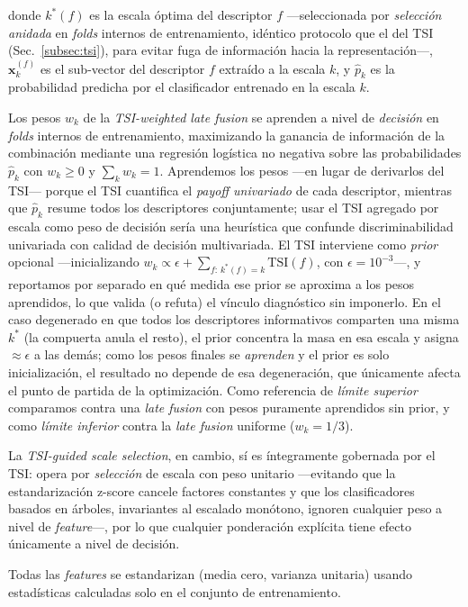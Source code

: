 \documentclass[conference]{IEEEtran}
\begin{document}
donde $k^*(f)$ es la escala óptima del descriptor $f$ ---seleccionada por \emph{selección anidada} en \textit{folds} internos de entrenamiento, idéntico protocolo que el del TSI (Sec.~\ref{subsec:tsi}), para evitar fuga de información hacia la representación---, $\mathbf{x}^{(f)}_{k}$ es el sub-vector del descriptor $f$ extraído a la escala $k$, y $\hat{p}_k$ es la probabilidad predicha por el clasificador entrenado en la escala $k$.


Los pesos $w_k$ de la \textit{TSI-weighted late fusion} se aprenden a nivel de \emph{decisión} en \textit{folds} internos de entrenamiento, maximizando la ganancia de información de la combinación mediante una regresión logística no negativa sobre las probabilidades $\hat{p}_k$ con $w_k\geq 0$ y $\sum_k w_k = 1$. Aprendemos los pesos ---en lugar de derivarlos del TSI--- porque el TSI cuantifica el \emph{payoff univariado} de cada descriptor, mientras que $\hat{p}_k$ resume todos los descriptores conjuntamente; usar el TSI agregado por escala como peso de decisión sería una heurística que confunde discriminabilidad univariada con calidad de decisión multivariada. El TSI interviene como \emph{prior} opcional ---inicializando $w_k \propto \epsilon + \sum_{f:\,k^*(f)=k}\mathrm{TSI}(f)$, con $\epsilon=10^{-3}$---, y reportamos por separado en qué medida ese prior se aproxima a los pesos aprendidos, lo que valida (o refuta) el vínculo diagnóstico sin imponerlo. En el caso degenerado en que todos los descriptores informativos comparten una misma $k^*$ (la compuerta anula el resto), el prior concentra la masa en esa escala y asigna $\approx\epsilon$ a las demás; como los pesos finales se \emph{aprenden} y el prior es solo inicialización, el resultado no depende de esa degeneración, que únicamente afecta el punto de partida de la optimización. Como referencia de \emph{límite superior} comparamos contra una \textit{late fusion} con pesos puramente aprendidos sin prior, y como \emph{límite inferior} contra la \textit{late fusion} uniforme ($w_k=1/3$).

La \textit{TSI-guided scale selection}, en cambio, sí es íntegramente gobernada por el TSI: opera por \emph{selección} de escala con peso unitario ---evitando que la estandarización \mbox{z-score} cancele factores constantes y que los clasificadores basados en árboles, invariantes al escalado monótono, ignoren cualquier peso a nivel de \textit{feature}---, por lo que cualquier ponderación explícita tiene efecto únicamente a nivel de decisión.

Todas las \textit{features} se estandarizan (media cero, varianza unitaria) usando estadísticas calculadas solo en el conjunto de entrenamiento.
\end{document}
